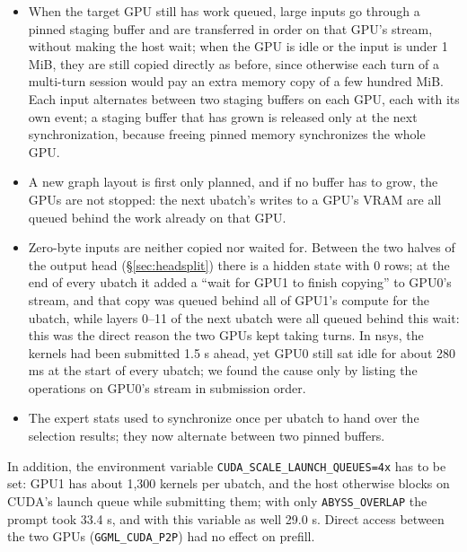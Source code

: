 \documentclass[11pt,a4paper]{article}
\newcommand{\code}[1]{\texttt{#1}}
\begin{document}
\begin{itemize}
  \item When the target GPU still has work queued, large inputs go through a pinned staging buffer and are transferred in order on that GPU's stream, without making the host wait; when the GPU is idle or the input is under 1 MiB, they are still copied directly as before, since otherwise each turn of a multi-turn session would pay an extra memory copy of a few hundred MiB. Each input alternates between two staging buffers on each GPU, each with its own event; a staging buffer that has grown is released only at the next synchronization, because freeing pinned memory synchronizes the whole GPU.
  \item A new graph layout is first only planned, and if no buffer has to grow, the GPUs are not stopped: the next ubatch's writes to a GPU's VRAM are all queued behind the work already on that GPU.
  \item Zero-byte inputs are neither copied nor waited for. Between the two halves of the output head (\S\ref{sec:headsplit}) there is a hidden state with 0 rows; at the end of every ubatch it added a ``wait for GPU1 to finish copying'' to GPU0's stream, and that copy was queued behind all of GPU1's compute for the ubatch, while layers 0--11 of the next ubatch were all queued behind this wait: this was the direct reason the two GPUs kept taking turns. In nsys, the kernels had been submitted 1.5 s ahead, yet GPU0 still sat idle for about 280 ms at the start of every ubatch; we found the cause only by listing the operations on GPU0's stream in submission order.
  \item The expert stats used to synchronize once per ubatch to hand over the selection results; they now alternate between two pinned buffers.
\end{itemize}

In addition, the environment variable \code{CUDA\_SCALE\_LAUNCH\_QUEUES=4x} has to be set: GPU1 has about 1,300 kernels per ubatch, and the host otherwise blocks on CUDA's launch queue while submitting them; with only \code{ABYSS\_OVERLAP} the prompt took 33.4 s, and with this variable as well 29.0 s. Direct access between the two GPUs (\code{GGML\_CUDA\_P2P}) had no effect on prefill.
\end{document}
